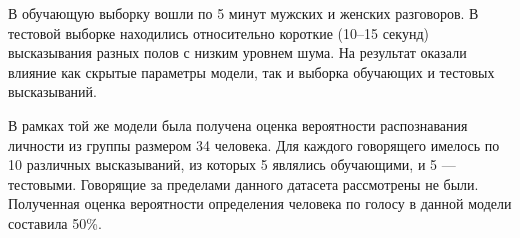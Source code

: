 \documentclass{gost-7-32}
\begin{document}
В обучающую выборку вошли по 5 минут мужских и женских разговоров.
В тестовой выборке находились относительно короткие (10--15 секунд) высказывания разных полов с низким уровнем шума.
На результат оказали влияние как скрытые параметры модели, так и выборка обучающих и тестовых высказываний.

В рамках той же модели была получена оценка вероятности распознавания личности из группы размером 34 человека.
Для каждого говорящего имелось по 10 различных высказываний, из которых 5 являлись обучающими, и 5 --- тестовыми.
Говорящие за пределами данного датасета рассмотрены не были.
Полученная оценка вероятности определения человека по голосу в данной модели составила 50\%.

\newpage
{}






%


%

%


\end{document}
